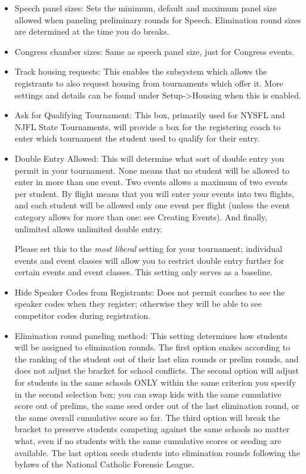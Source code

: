 \documentclass[12pt]{report} \usepackage {fullpage} \usepackage{times}
\begin{document}
\begin{itemize}

\item Speech panel sizes:   Sets the minimum, default and maximum panel
size allowed when paneling preliminary rounds for Speech.  Elimination
round sizes are determined at the time you do breaks.

\item Congress chamber sizes:  Same as speech panel size, just for Congress
events.

\item Track housing requests:  This enables the subsystem which allows the
registrants to also request housing from tournaments which offer it.  More
settings and details can be found under Setup->Housing when this is
enabled.

\item Ask for Qualifying Tournament:  This box, primarily used for NYSFL
and NJFL State Tournaments, will provide a box for the registering coach to
enter which tournament the student used to qualify for their entry.

\item Double Entry Allowed: This will determine what sort of double entry
you permit in your tournament.  None means that no student will be allowed
to enter in more than one event.    Two events allows a maximum of two
events per student.   By flight means that you will enter your events into
two flights, and each student will be allowed only one event per flight
(unless the event category allows for more than one: see Creating Events).
And finally, unlimited allows unlimited double entry.

Please set this to the \emph{most liberal} setting for your tournament;
individual events and event classes will allow you to restrict double entry
further for certain events and event classes.   This setting only serves as
a baseline.

\item Hide Speaker Codes from Registrants: 	 Does not permit coaches to see
the speaker codes when they register; otherwise they will be able to see
competitor codes during registration.

\item Elimination round paneling method:  This setting determines how
students will be assigned to elimination rounds.  The first option snakes
according to the ranking of the student out of their last elim rounds or
prelim rounds, and does not adjust the bracket for school conflicts.  The
second option will adjust for students in the same schools ONLY within the
same criterion you specify in the second selection box; you can swap kids
with the same cumulative score out of prelims, the same seed order out of
the last elimination round, or the same overall cumulative score so far.
The third option will break the bracket to preserve students competing
against the same schools no matter what, even if no students with the same
cumulative scores or seeding are available.  The last option seeds students
into elimination rounds following the bylaws of the National Catholic
Forensic League.


\end{itemize}
\end{document}
